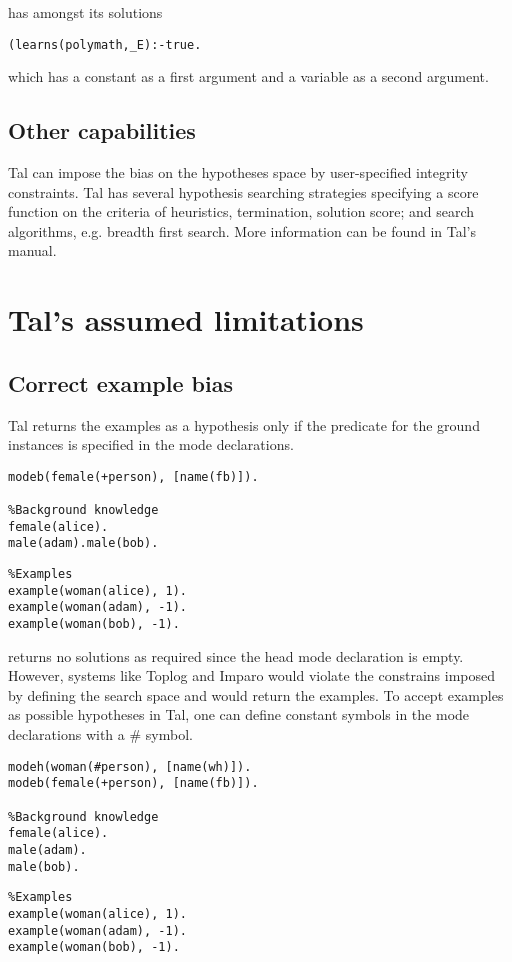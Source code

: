 has amongst its solutions
\begin{lstlisting}
(learns(polymath,_E):-true.
\end{lstlisting}
which has a constant  as a first argument and a variable as a second argument.
\subsection{Other capabilities}
Tal can impose the bias on the hypotheses space by user-specified integrity constraints. Tal has several hypothesis searching strategies specifying a score function on the criteria of heuristics, termination, solution score; and search algorithms, e.g. breadth first search. More information can be found in Tal's manual.

\section{Tal's assumed limitations}

\subsection{Correct example bias}
Tal returns the examples as a hypothesis only if the predicate for the ground instances is specified in the mode declarations.

\begin{minipage}[t]{.55\textwidth}
\begin{lstlisting}
modeb(female(+person), [name(fb)]).

%Background knowledge
female(alice).
male(adam).male(bob).
\end{lstlisting}
\end{minipage}
\begin{minipage}[t]{.20\textwidth}
\begin{lstlisting}
%Examples
example(woman(alice), 1).
example(woman(adam), -1).
example(woman(bob), -1).
\end{lstlisting}
\end{minipage}

returns no solutions as required since the head mode declaration is empty. However, systems like Toplog and Imparo would violate the constrains imposed by defining the search space and would return the examples.
To accept examples as possible hypotheses in Tal, one can define constant symbols in the mode declarations with a \# symbol.

\begin{minipage}[t]{.55\textwidth}
\begin{lstlisting}
modeh(woman(#person), [name(wh)]).
modeb(female(+person), [name(fb)]).

%Background knowledge
female(alice).
male(adam).
male(bob).
\end{lstlisting}
\end{minipage}
\begin{minipage}[t]{.20\textwidth}
\begin{lstlisting}
%Examples
example(woman(alice), 1).
example(woman(adam), -1).
example(woman(bob), -1).
\end{lstlisting}
\end{minipage}

